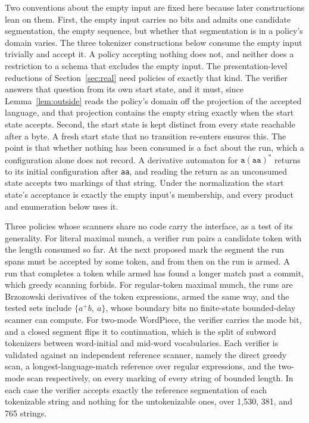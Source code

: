\documentclass[11pt,a4paper]{article}
\theoremstyle{definition}
\theoremstyle{plain}
\newcommand{\code}[1]{\texttt{#1}}
\begin{document}
Two conventions about the empty input are fixed here because later constructions lean on them. First, the empty input
carries no bits and admits one candidate segmentation, the empty sequence, but whether that segmentation is in a
policy's domain varies. The three tokenizer constructions below consume the empty input trivially and accept it. A
policy accepting nothing does not, and neither does a restriction to a schema that excludes the empty input. The
presentation-level reductions of Section~\ref{sec:real} need policies of exactly that kind. The verifier answers that
question from its own start state, and it must, since Lemma~\ref{lem:outside} reads the policy's domain off the
projection of the accepted language, and that projection contains the empty string exactly when the start state accepts.
Second, the start state is kept distinct from every state reachable after a byte. A fresh start state that no transition
re-enters ensures this. The point is that whether nothing has been consumed is a fact about the run, which a
configuration alone does not record. A derivative automaton for $\code{a}(\code{aa})^{*}$ returns to its initial
configuration after \code{aa}, and reading the return as an unconsumed state accepts two markings of that string. Under
the normalization the start state's acceptance is exactly the empty input's membership, and every product and
enumeration below uses it.

Three policies whose scanners share no code carry the interface, as a test of its generality. For literal maximal munch,
a verifier run pairs a candidate token with the length consumed so far. At the next proposed mark the segment the run
spans must be accepted by some token, and from then on the run is armed. A run that completes a token while armed has
found a longer match past a commit, which greedy scanning forbids. For regular-token maximal munch, the runs are
Brzozowski derivatives of the token expressions, armed the same way, and the tested sets include $\{a^{+}b,\ a\}$, whose
boundary bits no finite-state bounded-delay scanner can compute. For two-mode WordPiece, the verifier carries the mode
bit, and a closed segment flips it to continuation, which is the split of subword tokenizers between word-initial and
mid-word vocabularies. Each verifier is validated against an independent reference scanner, namely the direct greedy
scan, a longest-language-match reference over regular expressions, and the two-mode scan respectively, on every marking
of every string of bounded length. In each case the verifier accepts exactly the reference segmentation of each
tokenizable string and nothing for the untokenizable ones, over 1{,}530, 381, and 765 strings.
\end{document}
